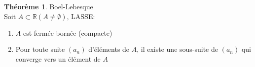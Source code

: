 \documentclass[fleqn]{article}
\theoremstyle{definition} \newtheorem*{defi}{D\'efinition}
\theoremstyle{definition} \newtheorem*{theo}{Th\'eor\`eme}
\theoremstyle{definition} \newtheorem*{adh}{Caract\'erisation s\'equentielle de l'adh\'erence}
\theoremstyle{definition} \newtheorem*{prop}{Propri\'et\'e}
\theoremstyle{definition} \newtheorem*{fermitude}{Caract\'erisation s\'equentielle de la fermitude}
\begin{document}
\begin{theo}
	Boel-Lebesque \\ Soit $A \subset \mathbb{R} (A \neq \emptyset)$, LASSE:
	\begin{enumerate}
		\item $A$ est ferm\'ee born\'ee (compacte)
		\item Pour toute suite $(a_n)$ d'\'el\'ements de $A$, il existe une sous-suite de $(a_n)$ qui converge vers un \'el\'ement de $A$
	\end{enumerate}
\end{theo}
\end{document}
